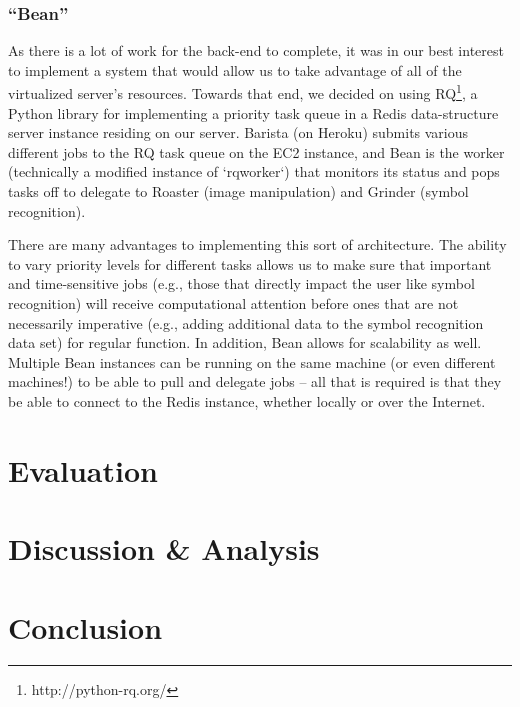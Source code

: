 \documentclass{acm_proc_article-sp}
\begin{document}
\subsubsection{``Bean''}
As there is a lot of work for the back-end to complete, it was in our best interest to
implement a system that would allow us to take advantage of all of the virtualized server's resources. Towards that end, we decided on using RQ\footnote{http://python-rq.org/}, a Python library for implementing a priority task queue in a Redis data-structure server instance residing on our server. Barista (on Heroku) submits various different jobs to the RQ task queue on the EC2 instance, and Bean is the worker (technically a modified instance of `rqworker`) that monitors its status and pops tasks off to delegate to Roaster (image manipulation) and Grinder (symbol recognition).

There are many advantages to implementing this sort of architecture. The ability to vary priority levels for different tasks allows us to make sure that important and time-sensitive jobs (e.g., those that directly impact the user like symbol recognition) will receive computational attention before ones that are not necessarily imperative (e.g., adding additional data to the symbol recognition data set) for regular function. In addition, Bean allows for scalability as well. Multiple Bean instances can be running on the same machine (or even different machines!) to be able to pull and delegate jobs -- all that is required is that they be able to connect to the Redis instance, whether locally or over the Internet.

\label{subsection:roaster}


\section{Evaluation}

\section{Discussion \& Analysis}

\section{Conclusion}



  
%
%


\balancecolumns

\end{document}

